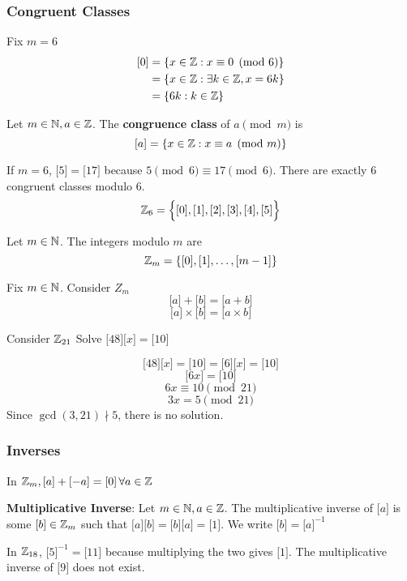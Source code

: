 \documentclass[english, 12pt]{article}
\begin{document}
\subsubsection*{Congruent Classes}
Fix $m=6$
\begin{align*}
\lbrack 0 \rbrack &=\{x \in {\mathbb{Z}} : x \equiv 0 \pmod 6\}\\
&= \{x \in {\mathbb{Z}}: \exists k \in {\mathbb{Z}}, x = 6k \} \\
&= \{6k:k \in {\mathbb{Z}} \}
\end{align*}
\begin{defn}
Let $m \in {\mathbb{N}}, a \in {\mathbb{Z}}$. The \textbf{congruence class} of $a \pmod m$ is \[\lbrack a \rbrack = \{x \in {\mathbb{Z}}: x \equiv a \pmod m \}\]
\end{defn}
\begin{exmp}
If $m=6$, $\lbrack 5 \rbrack = \lbrack 17 \rbrack$ because $5 \pmod 6 \equiv 17 \pmod 6$. There are exactly $6$ congruent classes modulo $6$.
\[{\mathbb{Z}}_{6} = \Big\{\lbrack 0 \rbrack,\lbrack 1 \rbrack,\lbrack 2 \rbrack,\lbrack 3 \rbrack,\lbrack 4 \rbrack,\lbrack 5 \rbrack\Big\} \]
\end{exmp}
\begin{defn}
Let $m \in {\mathbb{N}}$. The integers modulo $m$ are
\[{\mathbb{Z}}_{m}= \{\lbrack 0 \rbrack,\lbrack 1 \rbrack, \dots, \lbrack m-1 \rbrack\} \]
\end{defn}
\begin{defn}
Fix $m \in {\mathbb{N}}$. Consider $Z_{m}$
\[ \lbrack a \rbrack + \lbrack b \rbrack = \lbrack a + b \rbrack \]
\[ \lbrack a \rbrack \times \lbrack b \rbrack = \lbrack a \times b \rbrack\]
\end{defn}
\begin{exercise}
Consider ${\mathbb{Z}}_{21}$ Solve $\lbrack 48\rbrack\lbrack x \rbrack = \lbrack 10 \rbrack$
\begin{sol}
\[\lbrack 48\rbrack\lbrack x \rbrack = \lbrack 10 \rbrack =  \lbrack 6 \rbrack\lbrack x \rbrack = \lbrack 10 \rbrack \]
\[\lbrack 6x \rbrack = \lbrack 10 \rbrack \]
\[ 6x \equiv 10 \pmod{21} \]
\[ 3x = 5 \pmod{21} \]
Since $\gcd(3,21) \nmid 5$, there is no solution.
\end{sol}
\end{exercise}
\subsubsection*{Inverses}
In ${\mathbb{Z}}_{m},\lbrack a \rbrack + \lbrack -a \rbrack = \lbrack 0 \rbrack\, \forall a \in {\mathbb{Z}}$
\begin{defn}
\textbf{Multiplicative Inverse}: Let $m \in {\mathbb{N}}, a \in {\mathbb{Z}}$. The multiplicative inverse of $\lbrack a \rbrack$ is some $\lbrack b \rbrack \in {\mathbb{Z}}_{m}$ such that $\lbrack a \rbrack \lbrack b \rbrack = \lbrack b \rbrack \lbrack a \rbrack = \lbrack 1 \rbrack$. We write $\lbrack b \rbrack = \lbrack a \rbrack^{-1}$
\end{defn}
\begin{exmp}
In ${\mathbb{Z}}_{18}$, $\lbrack 5 \rbrack ^{-1} = \lbrack 11 \rbrack$ because multiplying the two gives $\lbrack 1 \rbrack$. The multiplicative inverse of $\lbrack 9 \rbrack$ does not exist.
\end{exmp}
\end{document}
